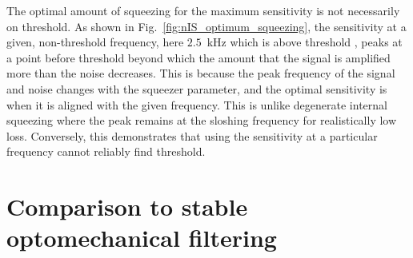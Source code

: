 The optimal amount of squeezing for the maximum sensitivity is not necessarily on threshold. As shown in Fig.~\ref{fig:nIS_optimum_squeezing}, the sensitivity at a given, non-threshold frequency, here $2.5$~kHz which is above threshold , peaks at a point before threshold beyond which the amount that the signal is amplified more than the noise decreases.
This is because the peak frequency of the signal and noise changes with the squeezer parameter, and the optimal sensitivity is when it is aligned with the given frequency. This is unlike degenerate internal squeezing where the peak remains at the sloshing frequency for realistically low loss. %
Conversely, this demonstrates that using the sensitivity at a particular frequency cannot reliably find threshold. %



\section{Comparison to stable optomechanical filtering} %
\label{sec:nIS_vs_sWLC}

